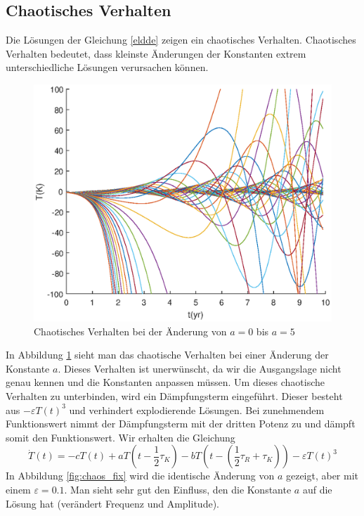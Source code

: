 \subsection{Chaotisches Verhalten}
Die Lösungen der Gleichung \eqref{eldde} zeigen ein chaotisches Verhalten.
Chaotisches Verhalten bedeutet, dass kleinste Änderungen der Konstanten extrem unterschiedliche Lösungen verursachen können. 
\begin{figure}
	\centering
	\includegraphics{verzoegert/inp/figures/param_a_e0.eps}
	\caption{Chaotisches Verhalten bei der Änderung von $a=0$ bis $a=5$}
	\label{fig:chaos}
\end{figure}
In Abbildung \ref{fig:chaos} sieht man das chaotische Verhalten bei einer Änderung der Konstante $a$.
Dieses Verhalten ist unerwünscht, da wir die Ausgangslage nicht genau kennen und die Konstanten anpassen müssen.
Um dieses chaotische Verhalten zu unterbinden, wird ein Dämpfungsterm eingeführt.
Dieser besteht aus $-\varepsilon T(t)^3$ und verhindert explodierende Lösungen.
Bei zunehmendem Funktionswert nimmt der Dämpfungsterm mit der dritten Potenz zu und dämpft somit den Funktionswert.
Wir erhalten die Gleichung
\begin{equation} \label{eldde_epsilon}
\dot{T}(t)=-cT(t)+aT(t-\frac{1}{2}\tau_K)-bT(t-(\frac{1}{2}\tau_R+\tau_K))-\varepsilon T(t)^3
\end{equation}
In Abbildung \ref{fig:chaos_fix} wird die identische Änderung von $a$ gezeigt, aber mit einem $\varepsilon = 0.1$.
Man sieht sehr gut den Einfluss, den die Konstante $a$ auf die Lösung hat (verändert Frequenz und Amplitude).
